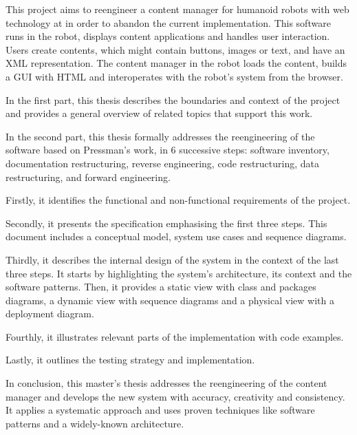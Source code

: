 % 
% 
%

This project aims to reengineer a content manager for humanoid robots with web technology at \company in order to abandon the current \flash implementation.
This software runs in the robot, displays content applications and handles user interaction.
Users create contents, which might contain buttons, images or text, and have an \acs{XML} representation.
The content manager in the robot loads the content, builds a \acs{GUI} with \acs{HTML} and interoperates with the robot's system from the browser.

In the first part, this thesis describes the boundaries and context of the project and provides a general overview of related topics that support this work.

In the second part, this thesis formally addresses the reengineering of the software based on Pressman's work, in 6 successive steps: software inventory, documentation restructuring, reverse engineering, code restructuring, data restructuring, and forward engineering.

Firstly, it identifies the functional and non-functional requirements of the project.

Secondly, it presents the specification emphasising the first three steps.
This document includes a conceptual model, system use cases and sequence diagrams.

Thirdly, it describes the internal design of the system in the context of the last three steps.
It starts by highlighting the system's architecture, its context and the software patterns.
Then, it provides a static view with class and packages diagrams, a dynamic view with sequence diagrams and a physical view with a deployment diagram.

Fourthly, it illustrates relevant parts of the implementation with code examples.

Lastly, it outlines the testing strategy and implementation.

In conclusion, this master's thesis addresses the reengineering of the content manager and develops the new system with accuracy, creativity and consistency. 
It applies a systematic approach and uses proven techniques like software patterns and a widely-known architecture.

